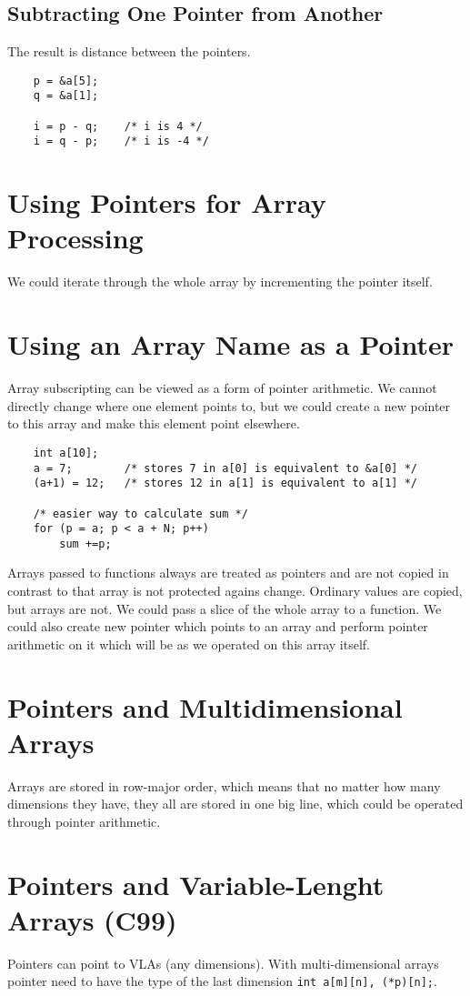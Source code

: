 \documentclass[openany]{book}
\begin{document}
    \subsection*{Subtracting One Pointer from Another}
    The result is distance between the pointers.
    \begin{lstlisting}
    p = &a[5];
    q = &a[1];

    i = p - q;    /* i is 4 */
    i = q - p;    /* i is -4 */
    \end{lstlisting}

    \section{Using Pointers for Array Processing}
    We could iterate through the whole array by incrementing the pointer itself.

    \section{Using an Array Name as a Pointer}
    Array subscripting can be viewed as a form of pointer arithmetic. We cannot directly change where one element points to, but we could create a new pointer to this array and make this element point elsewhere.
    \begin{lstlisting}
    int a[10];
    a = 7;        /* stores 7 in a[0] is equivalent to &a[0] */
    (a+1) = 12;   /* stores 12 in a[1] is equivalent to a[1] */

    /* easier way to calculate sum */
    for (p = a; p < a + N; p++)
        sum +=p;
    \end{lstlisting}
    Arrays passed to functions always are treated as pointers and are not copied in contrast to that array is
    not protected agains change. Ordinary values are copied, but arrays are not. We could pass a slice of the
    whole array to a function. We could also create new pointer which points to an array and perform pointer
    arithmetic on it which will be as we operated on this array itself.

    \section{Pointers and Multidimensional Arrays}
    Arrays are stored in row-major order, which means that no matter how many dimensions they have, they all are
    stored in one big line, which could be operated through pointer arithmetic. 

    \section{Pointers and Variable-Lenght Arrays (C99)}
    Pointers can point to VLAs (any dimensions). With multi-dimensional arrays pointer need to have the type of
    the last dimension \texttt{int a[m][n], (*p)[n];}.
\end{document}
